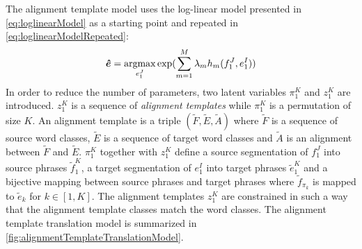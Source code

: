 The alignment template model uses the log-linear model presented
in \autoref{eq:loglinearModel} as a starting point and repeated in
\autoref{eq:loglinearModelRepeated}:
%
\begin{equation}
  \bm{\hat{e}} = \operatorname*{argmax}_{e_1^J} \exp(\sum_{m = 1}^M \lambda_m h_m(f_1^J, e_1^I))
  \label{eq:loglinearModelRepeated}
\end{equation}
%
In order to reduce the number of parameters, two latent variables $\pi_1^K$
and $z_1^K$ are introduced. $z_1^K$ is a sequence of \emph{alignment templates}
while $\pi_1^K$ is a permutation of size $K$. An alignment template
is a triple $(\tilde{F}, \tilde{E}, \tilde{A})$ where $\tilde{F}$ is a
sequence of source word classes, $\tilde{E}$ is a sequence of target
word classes and $\tilde{A}$ is an alignment between $\tilde{F}$
and $\tilde{E}$. $\pi_1^K$ together with $z_1^K$ define
a source segmentation of $f_1^J$ into source phrases $\tilde{f}_1^K$,
a target segmentation of $e_1^I$ into target phrases $\tilde{e}_1^K$ and
a bijective mapping between source phrases and target phrases where
$\tilde{f}_{\pi_k}$ is mapped to $\tilde{e}_{k}$ for $k \in [1,K]$.
The alignment templates $z_1^K$ are constrained in such a way that
the alignment template classes match the word classes.
The alignment template translation model is summarized
in \autoref{fig:alignmentTemplateTranslationModel}.
%
